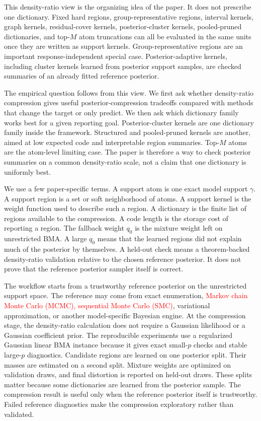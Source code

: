 \documentclass[twoside,11pt]{article}
\newcommand{\rev}[1]{\textcolor{red}{#1}}
\begin{document}
This density-ratio view is the organizing idea of the paper. It does not prescribe one dictionary. Fixed hard regions, group-representative regions, interval kernels, graph kernels, residual-cover kernels, posterior-cluster kernels, pooled-pruned dictionaries, and top-\(M\) atom truncations can all be evaluated in the same units once they are written as support kernels. Group-representative regions are an important response-independent special case. Posterior-adaptive kernels, including cluster kernels learned from posterior support samples, are checked summaries of an already fitted reference posterior.

The empirical question follows from this view. We first ask whether density-ratio compression gives useful posterior-compression tradeoffs compared with methods that change the target or only predict. We then ask which dictionary family works best for a given reporting goal. Posterior-cluster kernels are one dictionary family inside the framework. Structured and pooled-pruned kernels are another, aimed at low expected code and interpretable region summaries. Top-\(M\) atoms are the atom-level limiting case. The paper is therefore a way to check posterior summaries on a common density-ratio scale, not a claim that one dictionary is uniformly best.

We use a few paper-specific terms. A support atom is one exact model support \(\gamma\). A support region is a set or soft neighborhood of atoms. A support kernel is the weight function used to describe such a region. A dictionary is the finite list of regions available to the compression. A code length is the storage cost of reporting a region. The fallback weight \(q_0\) is the mixture weight left on unrestricted BMA. A large \(q_0\) means that the learned regions did not explain much of the posterior by themselves. A held-out check means a theorem-backed density-ratio validation relative to the chosen reference posterior. It does not prove that the reference posterior sampler itself is correct.

The workflow starts from a trustworthy reference posterior on the unrestricted support space. The reference may come from exact enumeration, \rev{Markov chain Monte Carlo (MCMC), sequential Monte Carlo (SMC)}, variational approximation, or another model-specific Bayesian engine. At the compression stage, the density-ratio calculation does not require a Gaussian likelihood or a Gaussian coefficient prior. The reproducible experiments use a regularized Gaussian linear BMA instance because it gives exact small-\(p\) checks and stable large-\(p\) diagnostics. Candidate regions are learned on one posterior split. Their masses are estimated on a second split. Mixture weights are optimized on validation draws, and final distortion is reported on held-out draws. These splits matter because some dictionaries are learned from the posterior sample. The compression result is useful only when the reference posterior itself is trustworthy. Failed reference diagnostics make the compression exploratory rather than validated.
\end{document}
